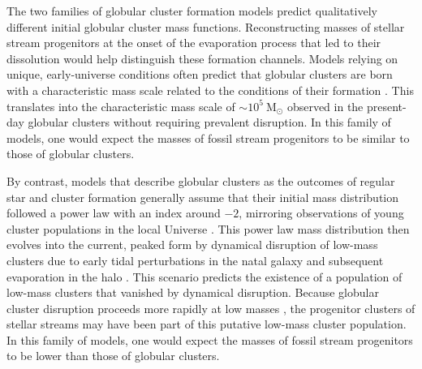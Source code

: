 \documentclass[twocolumn]{aastex63}
\newcommand{\msun}{\ensuremath{\textrm{M}_\odot}}
\begin{document}
The two families of globular cluster formation models predict qualitatively different initial globular cluster mass functions.
Reconstructing masses of stellar stream progenitors at the onset of the evaporation process that led to their dissolution would help distinguish these formation channels.
Models relying on unique, early-universe conditions often predict that globular clusters are born with a characteristic mass scale related to the conditions of their formation \citep[e.g.][]{peebles:1968,fall:1985,trenti:2015,madau:2020}.
This translates into the characteristic mass scale of $\sim10^5~\msun$ observed in the present-day globular clusters without requiring prevalent disruption.
In this family of models, one would expect the masses of fossil stream progenitors to be similar to those of globular clusters.




By contrast, models that describe globular clusters as the outcomes of regular star and cluster formation generally assume that their initial mass distribution followed a power law with an index around $-2$, mirroring observations of young cluster populations in the local Universe \citep[e.g.,][]{larsen:2009,adamo:2020}.
This power law mass distribution then evolves into the current, peaked form by dynamical disruption of low-mass clusters due to early tidal perturbations in the natal galaxy and subsequent evaporation in the halo \citep{elmegreen:1997,fall:2001,elmegreen:2010,kruijssen15b}.
This scenario predicts the existence of a population of low-mass clusters that vanished by dynamical disruption.
Because globular cluster disruption proceeds more rapidly at low masses \citep{baumgardt03,krumholz:2019}, the progenitor clusters of stellar streams may have been part of this putative low-mass cluster population.
In this family of models, one would expect the masses of fossil stream progenitors to be lower than those of globular clusters.
\end{document}
